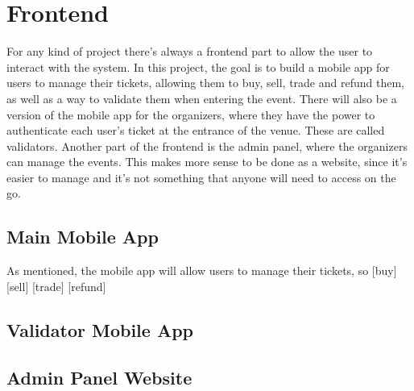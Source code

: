 \section{Frontend}
For any kind of project there's always a frontend part to allow the user to interact with the system. In this project, the goal is to build a mobile app for users to manage their tickets, allowing them to buy, sell, trade and refund them, as well as a way to validate them when entering the event.
There will also be a version of the mobile app for the organizers, where they have the power to authenticate each user's ticket at the entrance of the venue. These are called validators.
Another part of the frontend is the admin panel, where the organizers can manage the events. This makes more sense to be done as a website, since it's easier to manage and it's not something that anyone will need to access on the go.

\subsection{Main Mobile App}
As mentioned, the mobile app will allow users to manage their tickets, so
    [buy]
    [sell]
    [trade]
    [refund]

\subsection{Validator Mobile App}

\subsection{Admin Panel Website}
